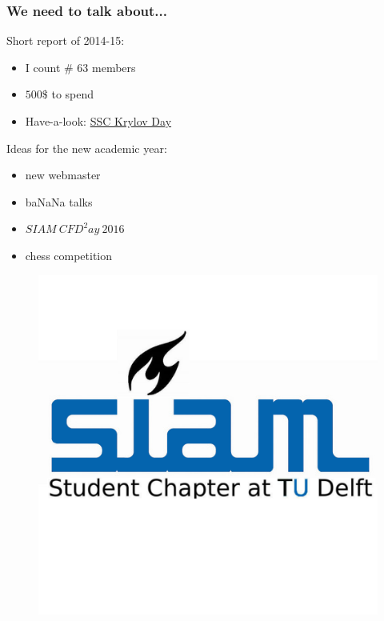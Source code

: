 \documentclass{beamer}
\begin{document}
\begin{frame}
\frametitle{We need to talk about...}
\vspace{0.5cm}
Short report of 2014-15:
\begin{itemize}
 \item I count \# 63 members
 \item $500 \$$ to spend
 \item Have-a-look: \href{http://sinews.siam.org/DetailsPage/tabid/607/ArticleID/504/European-Students-Gather-at-TU-Delft-for-Krylov-Day.aspx}{SSC Krylov Day}
\end{itemize}

Ideas for the new academic year:
\begin{itemize}
 \item new webmaster
 \item baNaNa talks
 \item $SIAM \ CFD^2ay \ 2016$
 \item chess competition 
 
\end{itemize}
 \vspace{-2cm}
 \begin{figure}
 \hfill
 \includegraphics[height=0.3\textheight]{images/SIAMSC_Delft}
\end{figure}
\end{frame}
\end{document}
